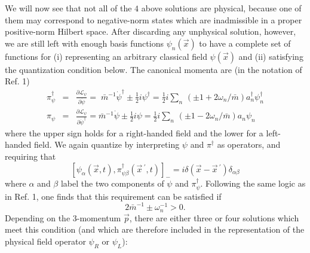 \documentclass{ws-procs9x6}
\begin{document}
We will now see that not all of the $4$ above solutions are physical,
because one of them may correspond to negative-norm states which are
inadmissible in a proper positive-norm Hilbert space. After discarding any
unphysical solution, however, we are still left with enough basis functions
$\psi _{n}\left( \vec{x}\right) $ to have a complete set of functions for (i)
representing an arbitrary classical field $\psi \left( 
\vec{x}\right) $ and
(ii) satisfying the quantization condition below. The canonical momenta are
(in the notation of Ref. 1)
\begin{eqnarray}
\pi _{\psi }^{\dagger } &=&\frac{\partial \mathcal{L}_{\psi }}{\partial
\dot{\psi}}=\;\bar{m}^{-1}\dot{\psi}^{\dagger }\pm \frac{1}{2}i\psi ^{\dagger }
=\frac{1}{2}i\sum_{n}\,\left( \pm 1+2\omega _{n}/\bar{m}\right)
a_{n}^{\dagger }\psi _{n}^{\dagger } \\
\pi _{\psi } &=&\frac{\partial \mathcal{L}_{\psi }}{\partial \dot{\psi}
^{\dagger }}=\bar{m}^{-1}\dot{\psi}\pm \frac{1}{2}i\psi =\frac{1}{2}
i\sum_{n}\,\left( \pm 1-2\omega _{n}/\bar{m}\right) a_{n}\psi _{n}
\end{eqnarray}
where the upper sign holds for a right-handed field and the lower for a
left-handed field. We again quantize by interpreting $\psi $ and $\pi
^{\dagger }$ as operators, and requiring that
\begin{equation}
\left[ \psi _{\alpha }\left( \vec{x},t\right) ,\pi _{\psi \beta }^{\dagger
}\left( \vec{x}\,^{\prime },t\right) \right] _{-}=i\delta \left( \vec{x}-
\vec{x}\,^{\prime }\right) \delta _{\alpha \beta }
\end{equation}
where $\alpha $ and $\beta $ label the two components of $\psi $ and $\pi
_{\psi }^{\dagger }$. Following the same logic as in Ref. 1, one
finds that this requirement can be satisfied if
\begin{equation}
2\bar{m}^{-1}\pm \omega _{n}^{-1}>0 .
\end{equation}
Depending on the 3-momentum $\vec{p}$, there
are either three or four solutions which meet this condition (and which
are therefore included in the representation of the physical field operator
$\psi _{R}$ or $\psi _{L}$):
\bigskip
\end{document}
